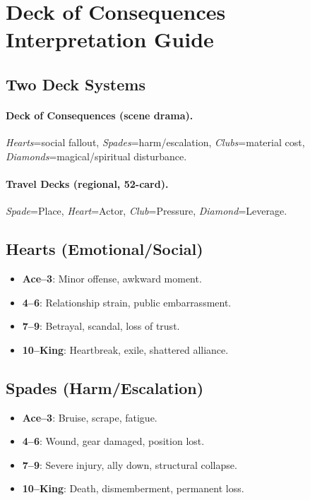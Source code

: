 \section*{Deck of Consequences Interpretation Guide}

\subsection*{Two Deck Systems}

\paragraph{Deck of Consequences (scene drama).}
\emph{Hearts}=social fallout, \emph{Spades}=harm/escalation, \emph{Clubs}=material cost, \emph{Diamonds}=magical/spiritual disturbance.

\paragraph{Travel Decks (regional, 52-card).}
\emph{Spade}=Place, \emph{Heart}=Actor, \emph{Club}=Pressure, \emph{Diamond}=Leverage.

\subsection*{Hearts (Emotional/Social)}

\begin{itemize}
    \item \textbf{Ace--3}: Minor offense, awkward moment.
    \item \textbf{4--6}: Relationship strain, public embarrassment.
    \item \textbf{7--9}: Betrayal, scandal, loss of trust.
    \item \textbf{10--King}: Heartbreak, exile, shattered alliance.
\end{itemize}

\subsection*{Spades (Harm/Escalation)}

\begin{itemize}
    \item \textbf{Ace--3}: Bruise, scrape, fatigue.
    \item \textbf{4--6}: Wound, gear damaged, position lost.
    \item \textbf{7--9}: Severe injury, ally down, structural collapse.
    \item \textbf{10--King}: Death, dismemberment, permanent loss.
\end{itemize}

